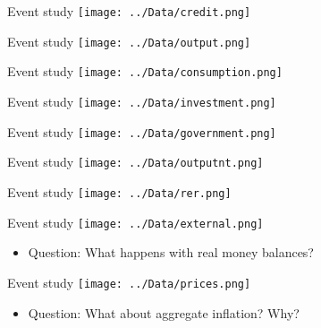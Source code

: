 \documentclass{beamer}
\begin{document}
\begin{frame}{Event study}
\centering
\texttt{[image: ../Data/credit.png]}
\end{frame}

\begin{frame}{Event study}
\centering
\texttt{[image: ../Data/output.png]}
\end{frame}

\begin{frame}{Event study}
\centering
\texttt{[image: ../Data/consumption.png]}
\end{frame}

\begin{frame}{Event study}
\centering
\texttt{[image: ../Data/investment.png]}
\end{frame}


\begin{frame}{Event study}
\centering
\texttt{[image: ../Data/government.png]}
\end{frame}


\begin{frame}{Event study}
\centering
\texttt{[image: ../Data/outputnt.png]}
\end{frame}

\begin{frame}{Event study}
\centering
\texttt{[image: ../Data/rer.png]}
\end{frame}

\begin{frame}{Event study}
\centering
\texttt{[image: ../Data/external.png]}
\begin{itemize}
\vspace*{-0.35cm}
\item Question: What happens with real money balances?
\end{itemize}
\end{frame}

\begin{frame}{Event study}
\centering
\texttt{[image: ../Data/prices.png]}
\begin{itemize}
\vspace*{-0.25cm}
\item Question: What about aggregate inflation? Why?
\end{itemize}
\end{frame}
\end{document}
